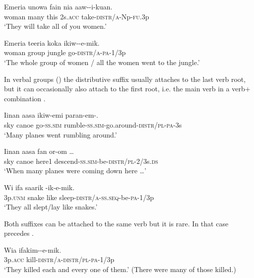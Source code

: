 \ea%
\label{ex:3:x492}
\gll Emeria unowa fain nia aaw--i-kuan. \\
woman many this 2s.\textsc{acc} take-\textsc{distr}/\textsc{a}-Np-\textsc{fu}.3p\\
\glt`They will take all of you women.'
\z

\ea%
\label{ex:3:x491}
\gll Emeria teeria koka ikiw--e-mik. \\
woman group jungle go-\textsc{distr}/\textsc{a}-\textsc{pa}-1/3p\\
\glt`The whole group of women / all the women went to the jungle.'
\z

In verbal groups () the distributive suffix usually attaches to the last verb root, but it can occasionally also attach to the first root, i.e. the main verb in a verb+ combination .

\ea%
\label{ex:3:x207}
\gll Iinan aasa ikiw-emi paran-em-. \\
sky canoe go-\textsc{ss}.\textsc{sim} rumble-\textsc{ss}.\textsc{sim}-go.around-\textsc{distr}/\textsc{pl}-\textsc{pa}-3s\\
\glt `Many planes went rumbling around.'
\z

\ea%
\label{ex:3:x490}
\gll Iinan aasa fan or-om {\dots} \\
sky canoe here1 descend-\textsc{ss}.\textsc{sim}-be-\textsc{distr}/\textsc{pl}-2/3s.\textsc{ds}\\
\glt`When many planes were coming down here {\dots}'
\z

\ea%
\label{ex:3:x208}
\gll Wi ifa saarik -ik-e-mik. \\
3p.\textsc{unm} snake like sleep-\textsc{distr}/\textsc{a}-\textsc{ss}.\textsc{seq}-be-\textsc{pa}-1/3p \\
\glt`They all slept/lay like snakes.'
\z

Both suffixes can be attached to the same verb but it is rare. In that case \textstyleEmphasizedVernacularWords{\nobreakdash-} precedes \textstyleEmphasizedVernacularWords{\nobreakdash-}.

\ea%
\label{ex:3:x206}
\gll Wia ifakim--e-mik. \\
3p.\textsc{acc} kill-\textsc{distr}/\textsc{a}-\textsc{distr}/\textsc{pl}-\textsc{pa}-1/3p \\
\glt`They killed each and every one of them.' (There were many of those killed.) 
\z

